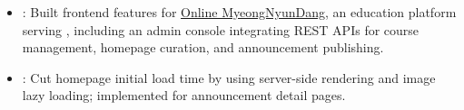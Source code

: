 \begin{itemize}
  \item {}: Built  frontend features for \href{https://mrdang.cs.skku.edu/}{Online MyeongNyunDang}, an education platform serving , including an admin console integrating REST APIs for course management, homepage curation, and announcement publishing.
  \item {}: Cut homepage initial load time by  using server-side rendering and image lazy loading; implemented  for announcement detail pages.
\end{itemize}
